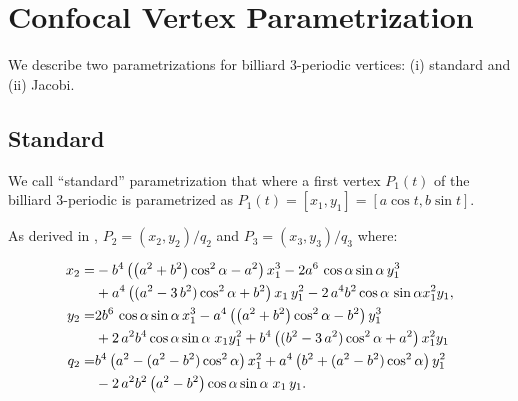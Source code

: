 \section{Confocal Vertex Parametrization}

We describe two parametrizations for billiard 3-periodic vertices: (i) standard and (ii) Jacobi.

\subsection{Standard}
\label{sec:02-confocal-standard-param}

We call ``standard'' parametrization that where a first vertex $P_1(t)$ of the billiard 3-periodic is parametrized as $P_1(t)=[x_1,y_1]=[a\cos{t},b\sin{t}]$.

As derived in \cite{garcia2019-incenter}, $P_2=(x_2,y_2)/q_2$ and $P_3=(x_3,y_3)/q_3$ where:

 \begin{equation}
 \label{eq:02-p2}
 \aligned 
x_{2}=&-{b}^{4} \left(  \left(   a^2+{b}^{2}\right)\cos^{2}\alpha   -{a}^{2}  \right) x_1^{3}-2{a}^{6} \,\cos  \alpha  \sin   \alpha  \, y_1^{3}\\
&+{a}^{4} \left(  ({a
}^{2}-3\, {b}^{2}) \cos^{2} \alpha  +{b}^{2}
 \right) {x_1}\,y_1^{2}-2\,{a}^{4}{b}^{2} \cos \alpha  \,\sin  \alpha    x_1^{2}{y_1},
\\
y_{2}=& 2{b}^{6} \,\cos \alpha\sin \alpha\,   x_1^{3}-{
a}^{4}  \left(  \left(   a^2+{b}^{2}\right)\cos^{2}  \alpha  -{b}^{2}  \right)  y_1^{3}\\
&+  2\,{a}^{2} {b}^{4}\cos \alpha \sin
  \alpha \; {x_1} y_1^{2} +{b}^{4}\left(  ({b
 }^{2}-3\, {a}^{2}) \cos^{2} \alpha  +{a}^{2}
  \right) x_1^{2}{y_1}
\\
q_2=&{b}^{4} \left( a^2-(a^2-b^2)\cos^2  \alpha   \right)
x_1^{2}+{a}^{4} \left(  {b}^{2}+(a^2-b^2)\cos^2 \alpha  
 \right) y_1^{2}\\
 & - 2\, {a}^{2}{b}^{2} \left({a}^{2} -{b}^{2} \right)\cos \alpha\sin \alpha \; {x_1}\,{
y_1}.
\endaligned
%
\end{equation}


